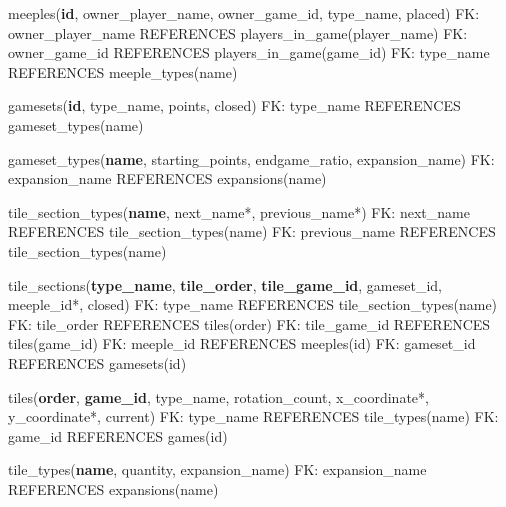 meeples(\textbf{id}, owner\_player\_name, owner\_game\_id, type\_name, placed)\newline
FK: owner\_player\_name REFERENCES players\_in\_game(player\_name)\newline
FK: owner\_game\_id REFERENCES players\_in\_game(game\_id)\newline
FK: type\_name REFERENCES meeple\_types(name)\newline

gamesets(\textbf{id}, type\_name, points, closed)\newline
FK: type\_name REFERENCES gameset\_types(name)\newline

gameset\_types(\textbf{name}, starting\_points, endgame\_ratio, expansion\_name)\newline
FK: expansion\_name REFERENCES expansions(name)\newline

tile\_section\_types(\textbf{name}, next\_name*, previous\_name*)\newline
FK: next\_name REFERENCES tile\_section\_types(name)\newline
FK: previous\_name REFERENCES tile\_section\_types(name)\newline

tile\_sections(\textbf{type\_name}, \textbf{tile\_order}, \textbf{tile\_game\_id}, gameset\_id, meeple\_id*, closed)\newline
FK: type\_name REFERENCES tile\_section\_types(name)\newline
FK: tile\_order REFERENCES tiles(order)\newline
FK: tile\_game\_id REFERENCES tiles(game\_id)\newline
FK: meeple\_id REFERENCES meeples(id)\newline
FK: gameset\_id REFERENCES gamesets(id)\newline

tiles(\textbf{order}, \textbf{game\_id}, type\_name, rotation\_count, x\_coordinate*, y\_coordinate*, current)\newline
FK: type\_name REFERENCES tile\_types(name)\newline
FK: game\_id REFERENCES games(id)\newline

tile\_types(\textbf{name}, quantity, expansion\_name)\newline
FK: expansion\_name REFERENCES expansions(name)\newline

